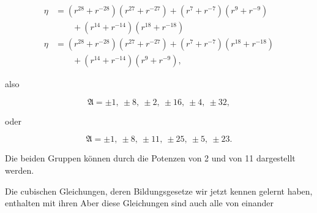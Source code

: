 \[ \begin{aligned}
\eta &= (r^{28} + r^{-28})(r^{27} + r^{-27}) + (r^7 + r^{-7})(r^9 + r^{-9}) \\
&\qquad + (r^{14} + r^{-14})(r^{18} + r^{-18}) \\
\eta &= (r^{28} + r^{-28})(r^{27} + r^{-27}) + (r^7 + r^{-7})(r^{18} + r^{-18}) \\
&\qquad + (r^{14} + r^{-14})(r^9 + r^{-9}),
\end{aligned} \]

also

\[ \mathfrak{A} = \pm 1, \ \pm 8, \ \pm 2, \ \pm 16, \ \pm 4, \ \pm 32, \]

oder

\[ \mathfrak{A} = \pm 1, \ \pm 8, \ \pm 11, \ \pm 25, \ \pm 5, \ \pm 23. \]

Die beiden Gruppen können durch die Potenzen von 2 und von 11 dargestellt
werden.

Die cubischen Gleichungen, deren Bildungsgesetze wir jetzt kennen gelernt
haben, enthalten mit ihren  Aber diese Gleichungen sind auch alle
von einander
